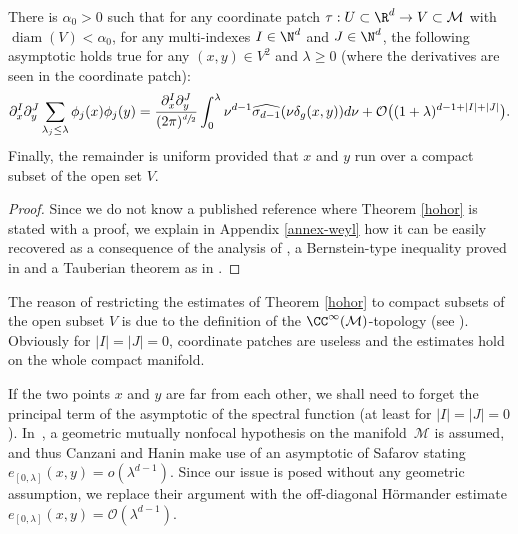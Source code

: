 \begin{theo}\label{hohor}
There is $\alpha_0>0$ such that for any coordinate patch $\tau:U\subset \R^d\to V\subset \mathcal{M}$ with $\operatorname{diam}(V)<\alpha_0$, for any multi-indexes $I\in \N^d$ and $J\in \N^d$, the following asymptotic holds true for any $(x,y)\in V^2$ and $\lambda \geq 0$ (where the derivatives are seen in the coordinate patch):
\begin{equation*}\partial_x^{I}\partial_y^J \sum_{\lambda_j\leq \lambda} \phi_j(x)\phi_j(y)=\frac{\partial_x^{I}\partial_y^J}{(2\pi)^{\sfrac{d}{2}}}\int_{0}^{\lambda }\nu^{d-1} \widehat{\sigma_{d-1}}(\nu \delta_g(x,y))
d\nu+\mathcal{O}\bigl((1+\lambda)^{d-1+|I|+|J|} \bigr).
\end{equation*}
Finally, the remainder is uniform provided that $x$ and $y$ run over a compact subset of the open set $V$.
\end{theo}
\begin{proof}
Since we do not know a published reference where Theorem \ref{hohor} is stated with a proof, we explain in Appendix \ref{annex-weyl} how it can be easily recovered as a consequence of the analysis of \cite{canzani2017c}, a Bernstein-type inequality proved in \cite{bin2004} and a Tauberian theorem as in \cite[Ch.\,4]{sogge2017fourier}.
\end{proof}

The reason of restricting the estimates of Theorem \ref{hohor} to compact subsets of the open subset $V$ is due to the definition of the $\CC^\infty(\mathcal{M})$-topology (see \cite[Ch.\,XVII.1 \& XVII.2]{dieud3}). Obviously for $|I|=|J|=0$, coordinate patches are useless and the estimates hold on the whole compact manifold.

If the two points $x$ and $y$ are far from each other, we shall need to forget the principal term of the asymptotic of the spectral function (at least for $|I|=|J|=0$).
In~\cite[line (79)]{canzani2015scaling}, a geometric mutually nonfocal hypothesis on the manifold~$\mathcal{M}$ is assumed, and thus Canzani and Hanin make use of an asymptotic of Safarov \cite{safarov1988} stating $e_{[0,\lambda]}(x,y)=o(\lambda^{d-1})$.
Since our issue is posed without any geometric assumption, we replace their argument with the off-diagonal Hörmander estimate $e_{[0,\lambda]}(x,y)=\mathcal{O}(\lambda^{d-1})$.

